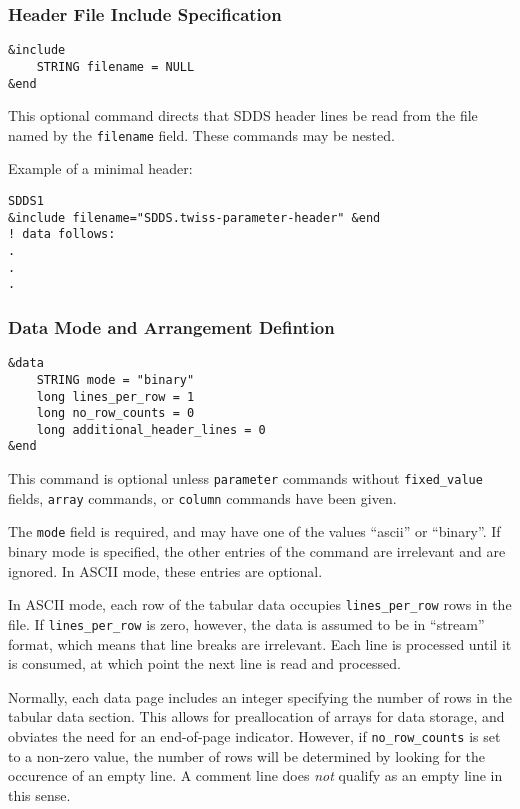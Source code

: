 \documentclass[11pt]{article}
\begin{document}
\subsubsection{Header File Include Specification}
\begin{verbatim}
&include
    STRING filename = NULL
&end
\end{verbatim}

This optional command directs that SDDS header lines be read from the file named by the {\tt filename} field.  These commands may be nested.

Example of a minimal header:
\begin{verbatim}
SDDS1
&include filename="SDDS.twiss-parameter-header" &end
! data follows:
.
.
.
\end{verbatim}

\subsubsection{Data Mode and Arrangement Defintion}
\begin{verbatim}
&data
    STRING mode = "binary"
    long lines_per_row = 1
    long no_row_counts = 0
    long additional_header_lines = 0
&end
\end{verbatim}

This command is optional unless {\tt parameter} commands without {\tt fixed\_value} fields, {\tt array} commands, or {\tt column} commands have been given.

The {\tt mode} field is required, and may have one of the values ``ascii'' or ``binary''.  If binary mode is specified, the other entries of the command are irrelevant and are ignored.  In ASCII mode, these entries are optional.

In ASCII mode, each row of the tabular data occupies {\tt lines\_per\_row} rows in the file.  If {\tt lines\_per\_row} is zero, however, the data is assumed to be in ``stream'' format, which means that line breaks are irrelevant. Each line is processed until it is consumed, at which point the next line is read and processed.

Normally, each data page includes an integer specifying the number of rows in the tabular data section.  This allows for preallocation of arrays for data storage, and obviates the need for an end-of-page indicator.  However, if {\tt no\_row\_counts} is set to a non-zero value, the number of rows will be determined by looking for the occurence of an empty line.  A comment line does {\em not} qualify as an empty line in this sense.
\end{document}
